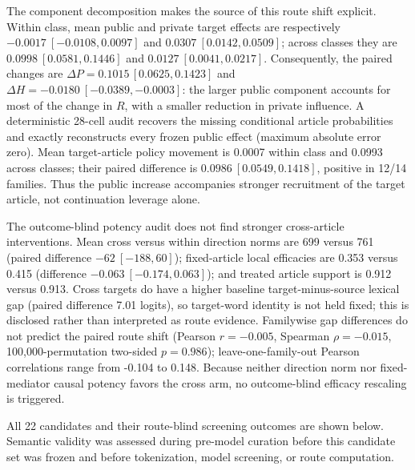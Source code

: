 \documentclass[
]{article}
\begin{document}
The component decomposition makes the source of this route shift
explicit. Within class, mean public and private target effects are
respectively \(-0.0017\ [-0.0108,0.0097]\) and
\(0.0307\ [0.0142,0.0509]\); across classes they are
\(0.0998\ [0.0581,0.1446]\) and \(0.0127\ [0.0041,0.0217]\).
Consequently, the paired changes are \(\Delta P=0.1015\,
[0.0625,0.1423]\) and \(\Delta H=-0.0180\ [-0.0389,-0.0003]\): the
larger public component accounts for most of the change in \(R\), with a
smaller reduction in private influence. A deterministic 28-cell audit
recovers the missing conditional article probabilities and exactly
reconstructs every frozen public effect (maximum absolute error zero).
Mean target-article policy movement is 0.0007 within class and 0.0993
across classes; their paired difference is \(0.0986\ [0.0549,0.1418]\),
positive in 12/14 families. Thus the public increase accompanies
stronger recruitment of the target article, not continuation leverage
alone.

The outcome-blind potency audit does not find stronger cross-article
interventions. Mean cross versus within direction norms are 699 versus
761 (paired difference \(-62\ [-188,60]\)); fixed-article local
efficacies are 0.353 versus 0.415 (difference
\(-0.063\ [-0.174,0.063]\)); and treated article support is 0.912 versus
0.913. Cross targets do have a higher baseline target-minus-source
lexical gap (paired difference 7.01 logits), so target-word identity is
not held fixed; this is disclosed rather than interpreted as route
evidence. Familywise gap differences do not predict the paired route
shift (Pearson \(r=-0.005\), Spearman \(\rho=-0.015\),
100,000-permutation two-sided \(p=0.986\)); leave-one-family-out Pearson
correlations range from -0.104 to 0.148. Because neither direction norm
nor fixed-mediator causal potency favors the cross arm, no outcome-blind
efficacy rescaling is triggered.

All 22 candidates and their route-blind screening outcomes are shown
below. Semantic validity was assessed during pre-model curation before
this candidate set was frozen and before tokenization, model screening,
or route computation.
\end{document}
